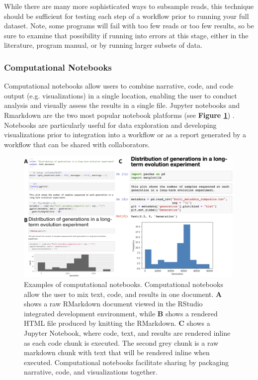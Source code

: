 \documentclass[10pt,letterpaper]{article}
\begin{document}
While there are many more sophisticated ways to subsample reads, this technique should be sufficient for testing each step of a workflow prior to running your full dataset. 
Note, some programs will fail with too few reads or too few results, so be sure to examine that possibility if running into errors at this stage, either in the literature, program manual, or by running larger subsets of data.

\subsubsection*{Computational Notebooks} 

Computational notebooks allow users to combine narrative, code, and code output (e.g. visualizations) in a single location, enabling the user to conduct analysis and visually assess the results in a single file.
Jupyter notebooks and Rmarkdown are the two most popular notebook platforms (see \textbf{Figure \ref{fig:nb_figure}}) \cite{kluyver2016jupyter, allaire2018rmarkdown}. 
Notebooks are particularly useful for data exploration and developing visualizations prior to integration into a workflow or as a report generated by a workflow that can be shared with collaborators. 

\begin{figure}
\includegraphics[width=0.99\textwidth]{figures/nb_figure.png}
\caption{Examples of computational notebooks. Computational notebooks allow the user to mix text, code, and results in one document. \textbf{A} shows a raw RMarkdown document viewed in the RStudio integrated development environment, while \textbf{B} shows a rendered HTML file produced by knitting the RMarkdown. \textbf{C} shows a Jupyter Notebook, where code, text, and results are rendered inline as each code chunk is executed. The second grey chunk is a raw markdown chunk with text that will be rendered inline when executed. Computational notebooks facilitate sharing by packaging narrative, code, and visualizations together.} 
\label{fig:nb_figure}
\end{figure}
\end{document}
